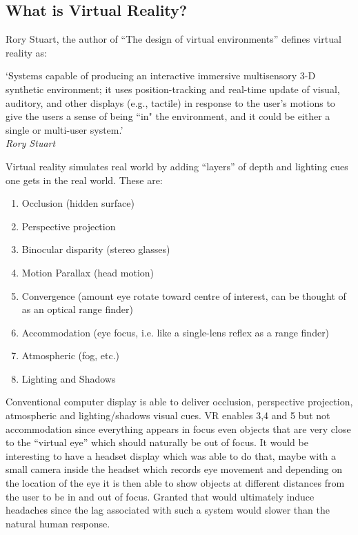 \subsection{What is Virtual Reality?}

Rory Stuart, the author of ``The design of virtual environments'' defines virtual reality as:

`Systems capable of producing an interactive immersive multisensory 3-D synthetic environment; it uses position-tracking and real-time update of visual, auditory, and other displays (e.g., tactile) in response to the user's motions to give the users a sense of being ``in" the environment, and it could be either a single or multi-user system.'\\
\emph{Rory Stuart}\cite{stuart1996design}

Virtual reality simulates real world by adding ``layers'' of depth and lighting cues one gets in the real world. These are:

\begin{enumerate}
    \item  Occlusion (hidden surface)
    \item  Perspective projection
    \item Binocular disparity (stereo glasses)
    \item Motion Parallax (head motion)
    \item Convergence (amount eye rotate toward centre of interest, can be thought of as an optical range finder)
    \item Accommodation (eye focus, i.e. like a single-lens reflex as a range finder)
    \item Atmospheric (fog, etc.)
    \item Lighting and Shadows 
\end{enumerate}

Conventional computer display is able to deliver occlusion, perspective projection, atmospheric and lighting/shadows visual cues. VR enables 3,4 and 5 but not accommodation since everything appears in focus even objects that are very close to the ``virtual eye'' which should naturally be out of focus. It would be interesting to have a headset display which was able to do that, maybe with a small camera inside the headset which records eye movement and depending on the location of the eye it is then able to show objects at different distances from the user to be in and out of focus. Granted that would ultimately induce headaches since the lag associated with such a system would slower than the natural human response. 

